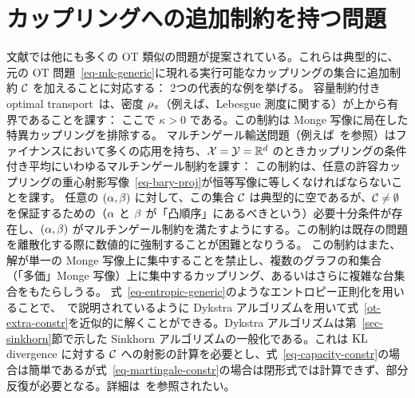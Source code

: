 \section{カップリングへの追加制約を持つ問題}

文献では他にも多くの OT 類似の問題が提案されている。これらは典型的に、元の OT 問題~\eqref{eq-mk-generic}に現れる実行可能なカップリングの集合に追加制約 $\mathcal{C}$ を加えることに対応する：
2つの代表的な例を挙げる。
容量制約付き optimal transport~\citep{km1}は、密度 $\rho_{\pi}$（例えば、Lebesgue 測度に関する）が上から有界であることを課す：
\eql{\label{eq-capacity-constr}
	\Cc = \enscond{ \pi }{ \density{\pi} \leq \kappa }
}
ここで $\kappa>0$ である。この制約は Monge 写像に局在した特異カップリングを排除する。
マルチンゲール輸送問題（例えば~\citet{GalichonMartingale,dolinsky2014martingale,TanTouzi,beiglbock2013model}を参照）はファイナンスにおいて多くの応用を持ち、$\mathcal{X}=\mathcal{Y}=\mathbb{R}^d$ のときカップリングの条件付き平均にいわゆるマルチンゲール制約を課す：
この制約は、任意の許容カップリングの重心射影写像~\eqref{eq-bary-proj}が恒等写像に等しくなければならないことを課す。
任意の $(\alpha,\beta)$ に対して、この集合 $\mathcal{C}$ は典型的に空であるが、$\mathcal{C} \neq \emptyset$ を保証するための（$\alpha$ と $\beta$ が「凸順序」にあるべきという）必要十分条件が存在し、$(\alpha,\beta)$ がマルチンゲール制約を満たすようにする。この制約は既存の問題を離散化する際に数値的に強制することが困難となりうる。
この制約はまた、解が単一の Monge 写像上に集中することを禁止し、複数のグラフの和集合（「多価」Monge 写像）上に集中するカップリング、あるいはさらに複雑な台集合をもたらしうる。
式~\eqref{eq-entropic-generic}のようなエントロピー正則化を用いることで、~\citet{2015-benamou-cisc}で説明されているように Dykstra アルゴリズムを用いて式~\eqref{ot-extra-constr}を近似的に解くことができる。Dykstra アルゴリズムは第~\ref{sec-sinkhorn}節で示した Sinkhorn アルゴリズムの一般化である。これは $\operatorname{KL}$ divergence に対する $\mathcal{C}$ への射影の計算を必要とし、式~\eqref{eq-capacity-constr}の場合は簡単であるが式~\eqref{eq-martingale-constr}の場合は閉形式では計算できず、部分反復が必要となる。詳細は~\citep{guo2017computational}を参照されたい。


